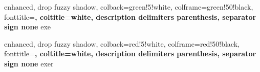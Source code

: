 %
{
	enhanced,                  %
	drop fuzzy shadow,         %
	colback=green!5!white,
	colframe=green!50!black,
	fonttitle=\bfseries,       %
	coltitle=white,            %
	description delimiters parenthesis, %
	separator sign none        %
}{exe}

%
{
	enhanced,                  %
	drop fuzzy shadow,         %
	colback=red!5!white,
	colframe=red!50!black,
	fonttitle=\bfseries,       %
	coltitle=white,            %
	description delimiters parenthesis, %
	separator sign none        %
}{exer}



\newtheorem{theorem}{Teorema}[chapter]
\newtheorem{lemma}[theorem]{Lema}
\newtheorem{corollary}[theorem]{Corolário}
\newtheorem{proposition}[theorem]{Proposição}

\theoremstyle{definition}
\newtheorem{definition}[theorem]{Definição}
\newtheorem{example}[theorem]{Exemplo}
\newtheorem{xca}[theorem]{Exercício}

\theoremstyle{remark}
\newtheorem{remark}[theorem]{Observação}



\newcommand{\R}{\mathbb{R}}				      %
\newcommand{\N}{\mathbb{N}}
\newcommand{\C}{\mathbb{C}}
\newcommand{\dt}[1]{{\color{blue}\textbf{#1}}}
\newcommand{\ep}{\varepsilon}
\newcommand{\nl}[1]{\|#1\|_{\mathcal{L}(X)}}
\newcommand{\dm}{d}
\newcommand{\vt}[1]{\overrightarrow{#1}}

\newcommand{\marcador}[2]{%
	\phantomsection%
	\addcontentsline{toc}{#1}{#2}%
	\noindent {\large \textbf{#2}}\par\vspace{1em}%
}


\newcommand{\n}[1]{\|#1\|}


